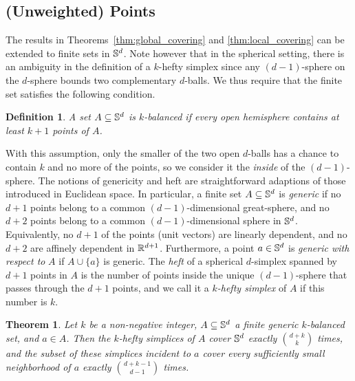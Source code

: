 \documentclass[10pt,a4paper]{article}
\newtheorem{theorem}{Theorem}[section]
\newtheorem{definition}{Definition}[section]
\newcommand {\mm}[1] {\ifmmode{#1}\else{\mbox{\(#1\)}}\fi}
\theoremstyle{plain}
\newcommand{\Rspace}        {\mm{{\mathbb R}}}
\newcommand{\Sspace}        {\mm{{\mathbb S}}}
\begin{document}
\subsection{(Unweighted) Points}
\label{sec:3.1}
The results in Theorems~\ref{thm:global_covering} and \ref{thm:local_covering} can be extended to finite sets in $\Sspace^d$.
Note however that in the spherical setting, there is an ambiguity in the definition of a $k$-hefty simplex since any $(d-1)$-sphere on the $d$-sphere bounds two complementary $d$-balls.
We thus require that the finite set satisfies the following condition.
\begin{definition}
  \label{dfn:balanced_sets}
  A set $A \subseteq \Sspace^d$ is \emph{$k$-balanced} if every open hemisphere contains at least $k+1$ points of $A$.
\end{definition}
With this assumption, only the smaller of the two open $d$-balls has a chance to contain $k$ and no more of the points, so we consider it the \emph{inside} of the $(d-1)$-sphere.
The notions of genericity and heft are straightforward adaptions of those introduced in Euclidean space.
In particular, a finite set $A \subseteq \Sspace^d$ is \emph{generic} if no $d+1$ points belong to a common $(d-1)$-dimensional great-sphere, and no $d+2$ points belong to a common $(d-1)$-dimensional sphere in $\Sspace^d$.
Equivalently, no $d+1$ of the points (unit vectors) are linearly dependent, and no $d+2$ are affinely dependent in $\Rspace^{d+1}$.
Furthermore, a point $a \in \Sspace^d$ is \emph{generic with respect to} $A$ if $A \cup \{a\}$ is generic.
The \emph{heft} of a spherical $d$-simplex spanned by $d+1$ points in $A$ is the number of points inside the unique $(d-1)$-sphere that passes through the $d+1$ points, and we call it a \emph{$k$-hefty simplex} of $A$ if this number is $k$.
\begin{theorem}
  \label{thm:covering_on_sphere}
  Let $k$ be a non-negative integer, $A \subseteq \Sspace^d$ a finite generic $k$-balanced set, and $a \in A$.
  Then the $k$-hefty simplices of $A$ cover $\Sspace^d$ exactly $\binom{d+k}{k}$ times, and the subset of these simplices incident to $a$ cover every sufficiently small neighborhood of $a$ exactly $\binom{d+k-1}{d-1}$ times.
\end{theorem}
\end{document}
